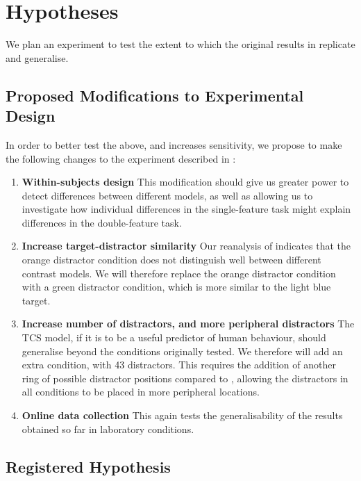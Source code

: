\documentclass[smallextended, natbib]{svjour3}       %
\begin{document}
\section{Hypotheses}

We plan an experiment to test the extent to which the original results in \cite{buetti2019predicting} replicate and generalise.

\subsection{Proposed Modifications to Experimental Design}

In order to better test the above, and increases sensitivity, we propose to make the following changes to the experiment described in \cite{buetti2019predicting}:

\begin{enumerate}
\item \textbf{Within-subjects design} This modification should give us greater power to detect differences between different models, as well as allowing us to investigate how individual differences in the single-feature task might explain differences in the double-feature task.
\\
\item \textbf{Increase target-distractor similarity} Our reanalysis of \cite{buetti2019predicting} indicates that the orange distractor condition does not distinguish well between different contrast models. We will therefore replace the orange distractor condition with a green distractor condition, which is more similar to the light blue target.
\\
\item \textbf{Increase number of distractors, and more peripheral distractors} The TCS model, if it is to be a useful predictor of human behaviour, should generalise beyond the conditions originally tested. We therefore will add an extra condition, with 43 distractors. This requires the addition of another ring of possible distractor positions compared to \cite{buetti2019predicting}, allowing the distractors in all conditions to be placed in more peripheral locations. 
\\
\item \textbf{Online data collection} This again tests the generalisability of the results obtained so far in laboratory conditions.
\end{enumerate}

\subsection{Registered Hypothesis}
\end{document}
